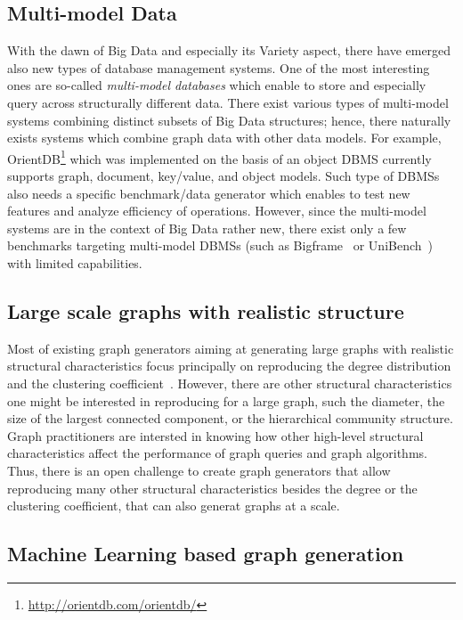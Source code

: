 \subsection{Multi-model Data}
With the dawn of Big Data and especially its Variety aspect, there have emerged
also new types of database management systems. One of the most interesting ones
are so-called \emph{multi-model databases} which enable to store and especially
query across structurally different data. There exist various types of
multi-model systems combining  distinct subsets of Big Data structures; hence,
there naturally exists systems which combine graph data with other data models.
For example, OrientDB\footnote{\url{http://orientdb.com/orientdb/}} which was
implemented on the basis of an object DBMS currently supports graph, document,
key/value, and object models. Such type of DBMSs also needs a specific benchmark/data generator which enables
to test new features and analyze efficiency of operations. However, since the
multi-model systems are in the context of Big Data rather new, there exist only
a few benchmarks targeting multi-model DBMSs (such as
Bigframe~\cite{journals/pvldb/KunjirKB14} or UniBench~\cite{conf/cidr/lu17})
with limited capabilities.

\subsection{Large scale graphs with realistic structure}

Most of existing graph generators aiming at generating large graphs with realistic
structural characteristics focus principally on reproducing the degree
distribution and the clustering
coefficient~\cite{kolda2014scalable,edunov2016darwini}. However, there are other
structural characteristics one might be interested in reproducing for a large
graph, such the diameter, the size of the largest connected component, or the
hierarchical community structure. Graph practitioners are intersted in knowing
how other high-level structural characteristics affect the performance of graph
queries and graph algorithms. Thus, there is an open challenge to create
graph generators that allow reproducing many other structural characteristics
besides the degree or the clustering coefficient, that can also generat graphs
at a scale.


\subsection{Machine Learning based graph generation}

